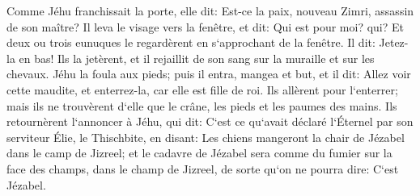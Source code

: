 \verse Comme Jéhu franchissait la porte, elle dit: Est-ce la paix, nouveau Zimri, assassin de son maître? 
\verse Il leva le visage vers la fenêtre, et dit: Qui est pour moi? qui? Et deux ou trois eunuques le regardèrent en s`approchant de la fenêtre. 
\verse Il dit: Jetez-la en bas! Ils la jetèrent, et il rejaillit de son sang sur la muraille et sur les chevaux. Jéhu la foula aux pieds; 
\verse puis il entra, mangea et but, et il dit: Allez voir cette maudite, et enterrez-la, car elle est fille de roi. 
\verse Ils allèrent pour l`enterrer; mais ils ne trouvèrent d`elle que le crâne, les pieds et les paumes des mains. 
\verse Ils retournèrent l`annoncer à Jéhu, qui dit: C`est ce qu`avait déclaré l`Éternel par son serviteur Élie, le Thischbite, en disant: Les chiens mangeront la chair de Jézabel dans le camp de Jizreel; 
\verse et le cadavre de Jézabel sera comme du fumier sur la face des champs, dans le champ de Jizreel, de sorte qu`on ne pourra dire: C`est Jézabel. 

